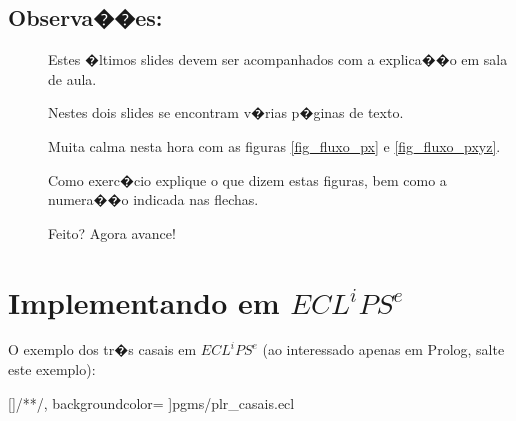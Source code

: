 \documentclass[final,a4paper]{article}
\begin{document}
\newpage
\subsection{Observa��es:}

\begin{description}


\item [] \textsf{Estes �ltimos slides devem ser acompanhados com
a explica��o em sala de aula.}

\item [] \textsf{Nestes dois slides se encontram v�rias
p�ginas de texto.}


\item [] \textsf{Muita calma nesta hora com as figuras \ref{fig_fluxo_px} e \ref{fig_fluxo_pxyz}}.

\item [] \textsf{Como exerc�cio explique o que dizem estas figuras, bem como a numera��o indicada nas flechas}.

\item [] \textsf{Feito? Agora avance!}

\end{description}

\section{Implementando em  {\bf $ECL^iPS^e$}}

O exemplo dos tr�s casais em $ECL^iPS^e$ (ao interessado apenas em Prolog, salte este exemplo):

[\color{blue}]{/*}{*/}, %
              backgroundcolor=\color{yellow}  %
		 ]{pgms/plr_casais.ecl}
\end{document}

